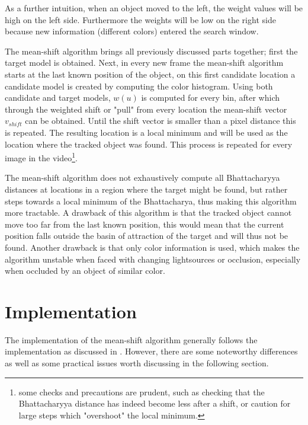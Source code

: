 \documentclass[a4paper,11pt]{article}
\begin{document}
As a further intuition, when an object moved to the left, the weight values will be high on the left side. Furthermore the weights will be low on the right side because new information (different colors) entered the search window. 

The mean-shift algorithm brings all previously discussed parts together; first the target model is obtained. Next, in every new frame the mean-shift algorithm starts at the last known position of the object, on this first candidate location a candidate model is created by computing the color histogram. Using both candidate and target models, $w(u)$ is computed for every bin, after which through the weighted shift or "pull" from every location the mean-shift vector $v_{shift}$ can be obtained. Until the shift vector is smaller than a pixel distance this is repeated. The resulting location is a local minimum and will be used as the location where the tracked object was found. This process is repeated for every image in the video\footnote{some checks and precautions are prudent, such as checking that the Bhattacharyya distance has indeed become less after a shift, or caution for large steps which "overshoot" the local minimum. }.

The mean-shift algorithm does not exhaustively compute all Bhattacharyya distances at locations in a region where the target might be found, but rather steps towards a local minimum of the Bhattacharya, thus making this algorithm more tractable. A drawback of this algorithm is that the tracked object cannot move too far from the last known position, this would mean that the current position falls outside the basin of attraction of the target and will thus not be found. Another drawback is that only color information is used, which makes the algorithm unstable when faced with changing lightsources or occlusion, especially when occluded by an object of similar color.


	
\section{Implementation}
The implementation of the mean-shift algorithm generally follows the implementation as discussed in \cite{mean_shift}. However, there are some noteworthy differences as well as some practical issues worth discussing in the following section. 
\end{document}
